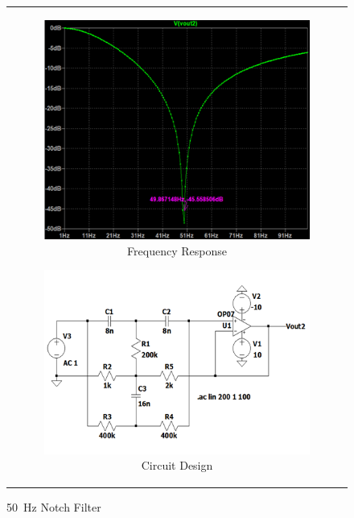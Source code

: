 \documentclass[hidelinks,12pt]{article}
\begin{document}
	\begin{figure}[!h]
		\centering
			\begin{tabular}{c}
				\begin{subfigure}[t]{0.4\textwidth}
					\centering
					\includegraphics[width=\textwidth]{figures/Notch Filter Design/50hz_freq_response}
					\caption{Frequency Response}
				\end{subfigure}
				\hfill
				\begin{subfigure}[t]{0.45\textwidth}
					\centering
					\includegraphics[width=\textwidth]{figures/Notch Filter Design/50hz_circ_design}
					\caption{Circuit Design}
				\end{subfigure} \\
			\end{tabular}
		\caption{50~Hz Notch Filter}
	\end{figure}
\end{document}

